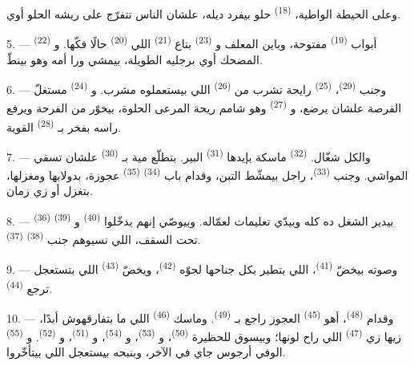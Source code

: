 وعلى الحيطة الواطية،  \textsuperscript{(18)} حلو بيفرد ديله، علشان
الناس تتفرّج على ريشه الحلو أوي.

\VUsaut{3.0mm}

5. --- أبواب  \textsuperscript{(19)} مفتوحة، وباين المعلف
و \textsuperscript{(23)} بتاع  \textsuperscript{(21)} اللي
 \textsuperscript{(20)} حالًا فكّها. و \textsuperscript{(22)}
المضحك أوي برجليه الطويلة، بيمشي ورا أمه وهو بينطّ.

6. --- وجنب  \textsuperscript{(29)}، 
\textsuperscript{(25)} رايحة تشرب من  \textsuperscript{(26)} اللي
بيستعملوه مشرب. و \textsuperscript{(24)} مستغلّ الفرصة علشان يرضع،
و \textsuperscript{(27)} وهو شامم ريحة المرعى الحلوة، بيخوّر من الفرحة
ويرفع راسه بفخر بـ \textsuperscript{(28)} القوية.

7. --- والكل شغّال.  \textsuperscript{(32)} ماسكة بإيدها
 \textsuperscript{(31)} البير. بتطلّع مية بـ
\textsuperscript{(30)} علشان تسقي المواشي. وجنب  \textsuperscript{(33)}،
راجل بيمشّط التبن، وقدام باب  \textsuperscript{(34)} 
\textsuperscript{(35)} عجوزة، بدولابها ومغزلها، بتغزل  أو
 زي زمان.

\VUsaut{3.0mm}
\VUsaut{3.0mm}

8. ---  \textsuperscript{(36)} بيدير الشغل ده كله وبيدّي تعليمات
لعمّاله. وبيوصّي إنهم يدخّلوا  \textsuperscript{(40)} و
\textsuperscript{(39)} تحت السقف، اللي نسيوهم جنب  \textsuperscript{(38)}
 \textsuperscript{(37)}.

9. --- وصوته بيخضّ  \textsuperscript{(41)}، اللي بتطير بكل جناحها
لجوّه  \textsuperscript{(42)}، ويخضّ 
\textsuperscript{(43)} اللي بتستعجل ترجع  \textsuperscript{(44)}.

10. --- وقدام  \textsuperscript{(48)}، أهو 
\textsuperscript{(45)} العجوز راجع بـ \textsuperscript{(49)}. وماسك
 \textsuperscript{(46)} اللي ما بتفارقهوش أبدًا، زيها زي
 \textsuperscript{(47)} اللي راح لونها؛ وبيسوق للحظيرة
 \textsuperscript{(50)}، و \textsuperscript{(53)}،
و \textsuperscript{(54)}، و \textsuperscript{(51)}،
و \textsuperscript{(52)}. و \textsuperscript{(55)} الوفي
أرجوس جاي في الآخر، وبنبحه بيستعجل اللي بيتأخّروا.


